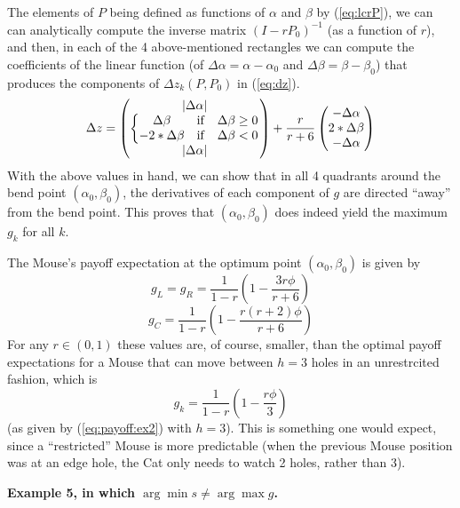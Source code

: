 \documentclass[12pt]{article}
\begin{document}
The elements of $P$ being defined as functions of $\alpha$ and $\beta$ by (\ref{eq:lcrP}), we can can analytically compute the inverse matrix $(I - rP_0)^{-1}$ (as a function of $r$), and then, in each of the 4 above-mentioned rectangles we can compute the coefficients of the linear function (of  $\Delta\alpha=\alpha-\alpha_0$ and $\Delta\beta=\beta - \beta_0$) that produces the components of $\Delta z_k(P,P_0)$ in (\ref{eq:dz}).
\begin{equation}
\label{eq:dz2}
\Delta z = 
\begin{pmatrix}
|\Delta\alpha| \\
\left\{\begin{matrix}
\Delta\beta & {\rm if} & \Delta\beta\ge0  \\
- 2*\Delta\beta & {\rm if} & \Delta\beta<0  \\
\end{matrix}\right. \\
|\Delta\alpha| \\
\end{pmatrix} + \frac{r}{r+6} \begin{pmatrix}
-\Delta\alpha \\
2*\Delta\beta \\
-\Delta\alpha \\
\end{pmatrix}
\end{equation}
With the above values in hand, we can show that in all 4 quadrants around the bend point $(\alpha_0,\beta_0)$, the derivatives of each component of $g$ are directed ``away'' from the bend point. This proves that $(\alpha_0,\beta_0)$ does indeed yield the maximum $g_k$ for all $k$.

The Mouse's payoff expectation at the optimum point  $(\alpha_0,\beta_0)$ is given by 
$$
g_L = g_R = \frac{1}{1-r} \left( 1 - \frac{3r\phi}{r+6}\right)
$$
$$
g_C = \frac{1}{1-r} \left( 1 - \frac{r(r+2)\phi}{r+6}\right)
$$
For any $r\in(0,1)$ these values are, of course, smaller, than the optimal payoff expectations for a Mouse that can move between $h=3$ holes in an unrestrcited fashion, which is
$$
g_k = \frac{1}{1-r}  \left(1  - \frac{r\phi}{3}\right)
$$
(as given by (\ref{eq:payoff:ex2}) with $h=3$). This is something one would expect, since a ``restricted'' Mouse is more predictable (when the previous Mouse position was at an edge hole, the Cat only needs to watch 2 holes, rather than 3).

{\bf Example 5, in which $\arg\min s \ne \arg\max g$.}
\end{document}

